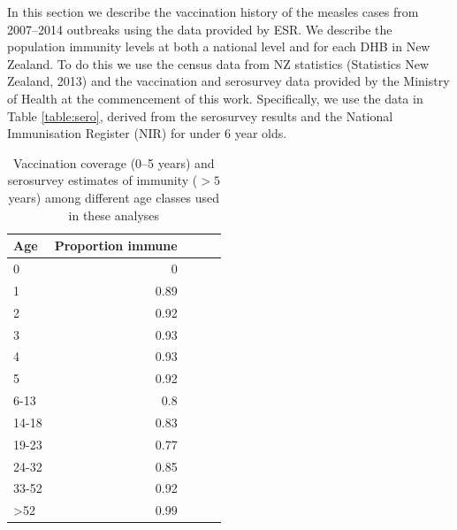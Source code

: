 \documentclass{article}
\begin{document}
In this section we describe the vaccination history of the measles cases from 2007--2014 outbreaks using the data provided by ESR. We describe the population immunity levels at both a national level and for each DHB in New Zealand. To do this we use the census data from NZ statistics (Statistics New Zealand, 2013) and the vaccination and serosurvey data provided by the Ministry of Health at the commencement of this work. Specifically, we use the data in Table \autoref{table:sero}, derived from the serosurvey results and the National Immunisation Register (NIR) for under 6 year olds.

\begin{table}[htdp]
\begin{center}
\begin{tabular}{lrrrr}
\hline
Age &  Proportion immune\\
\hline
0  & 0\\
1  & 0.89\\
2	& 0.92\\
3	& 0.93\\
4	& 0.93\\
5	& 0.92\\
6-13	& 0.8\\
14-18	& 0.83\\
19-23	& 0.77\\
24-32	& 0.85\\
33-52	& 0.92\\
>52	& 0.99\\
\hline
\end{tabular}
\end{center}
\caption{Vaccination coverage (0--5 years) and serosurvey estimates of immunity ($>5$ years) among different age classes used in these analyses}
\label{table:sero}
\end{table}%
\end{document}
